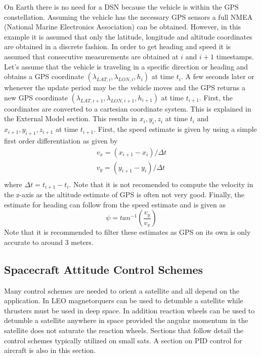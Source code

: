 \documentclass{article}
\begin{document}
On Earth there is no need for a DSN because the vehicle is within the GPS constellation. Assuming the vehicle has the necessary GPS sensors a full NMEA (National Marine Electronics Association) can be obtained. However, in this example it is assumed that only the latitude, longitude and altitude coordinates are obtained in a discrete fashion. In order to get heading and speed it is assumed that consecutive measurements are obtained at $i$ and $i+1$ timestamps. Let's assume that the vehicle is traveling in a specific direction or heading and obtains a GPS coordinate $(\lambda_{LAT,i},\lambda_{LON,i},h_i)$ at time $t_i$. A few seconds later or whenever the update period may be the vehicle moves and the GPS returns a new GPS coordinate $(\lambda_{LAT,i+1},\lambda_{LON,i+1},h_{i+1})$ at time $t_{i+1}$. First, the coordinates are converted to a cartesian coordinate system. This is explained in the External Model section. This results in $x_i,y_i,z_i$ at time $t_i$ and $x_{i+1},y_{i+1},z_{i+1}$ at time $t_{i+1}$. First, the speed estimate is given by using a simple first order differentiation as given by
\begin{equation}
\begin{matrix}
v_x = (x_{i+1}-x_{i})/\Delta t \\
v_y = (y_{i+1}-y_{i})/\Delta t \\
\end{matrix}
\end{equation}
where $\Delta t = t_{i+1}-t_i$. Note that it is not recomended to compute the velocity in the z-axis as the altitude estimate of GPS is often not very good. Finally, the estimate for heading can follow from the speed estimate and is given as
\begin{equation}
\psi = tan^{-1}\left(\frac{v_y}{v_x}\right)
\end{equation}
Note that it is recommended to filter these estimates as GPS on its own is only accurate to around 3 meters.

\subsection{Spacecraft Attitude Control Schemes}

Many control schemes are needed to orient a satellite and all depend
on the application. In LEO magnetorquers can be used to detumble a
satellite while thrusters must be used in deep space. In addition
reaction wheels can be used to detumble a satellite anywhere in space
provided the angular momentum in the satellite does not saturate the
reaction wheels. Sections that follow detail the control schemes
typically utilized on small sats. A section on PID control for
aircraft is also in this section.
\end{document}
